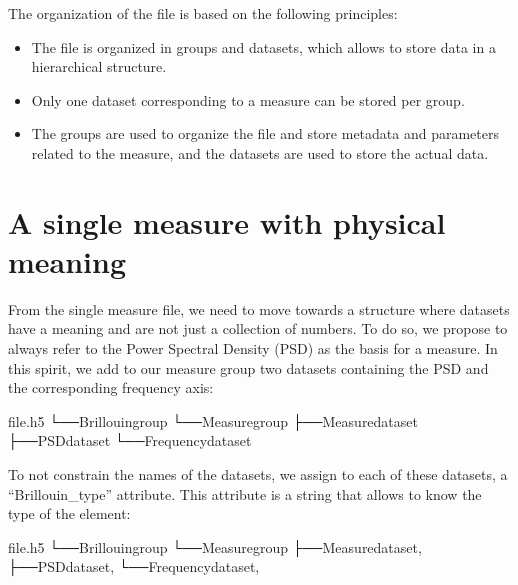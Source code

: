 \documentclass[letterpaper,10pt,english]{sphinxmanual}
\begin{document}
\sphinxAtStartPar
The organization of the file is based on the following principles:
\begin{itemize}
\item {} 
\sphinxAtStartPar
The file is organized in groups and datasets, which allows to store data in a hierarchical structure.

\item {} 
\sphinxAtStartPar
Only one dataset corresponding to a measure can be stored per group.

\item {} 
\sphinxAtStartPar
The groups are used to organize the file and store metadata and parameters related to the measure, and the datasets are used to store the actual data.

\end{itemize}


\section{A single measure with physical meaning}
\label{\detokenize{source/file_format:a-single-measure-with-physical-meaning}}
\sphinxAtStartPar
From the single measure file, we need to move towards a structure where datasets have a meaning and are not just a collection of numbers. To do so, we propose to always refer to the Power Spectral Density (PSD) as the basis for a measure. In this spirit, we add to our measure group two datasets containing the PSD and the corresponding frequency axis:

\begin{sphinxVerbatim}[commandchars=\\\{\}]
file.h5
└──Brillouingroup
└──Measuregroup
├──Measuredataset
├──PSDdataset
└──Frequencydataset
\end{sphinxVerbatim}

\sphinxAtStartPar
To not constrain the names of the datasets, we assign to each of these datasets, a “Brillouin\_type” attribute. This attribute is a string that allows to know the type of the element:

\begin{sphinxVerbatim}[commandchars=\\\{\}]
file.h5
└──Brillouingroup
└──Measuregroup
├──Measuredataset,
├──PSDdataset,
└──Frequencydataset,
\end{sphinxVerbatim}
\end{document}
